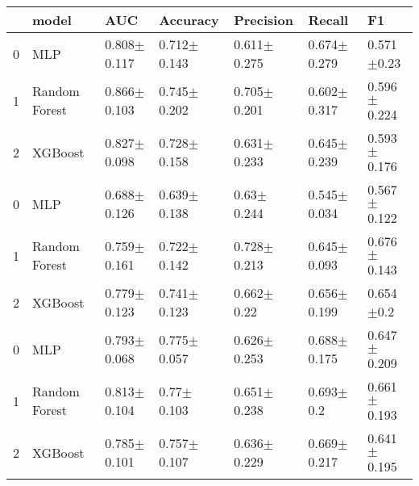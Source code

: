 \begin{tabular}{lllllll}
\toprule
 & model & AUC & Accuracy & Precision & Recall & F1 \\
\midrule
0 & MLP & 0.808$\pm$0.117 & 0.712$\pm$0.143 & 0.611$\pm$0.275 & 0.674$\pm$0.279 & 0.571$\pm$0.23 \\
1 & Random Forest & 0.866$\pm$0.103 & 0.745$\pm$0.202 & 0.705$\pm$0.201 & 0.602$\pm$0.317 & 0.596$\pm$0.224 \\
2 & XGBoost & 0.827$\pm$0.098 & 0.728$\pm$0.158 & 0.631$\pm$0.233 & 0.645$\pm$0.239 & 0.593$\pm$0.176 \\
0 & MLP & 0.688$\pm$0.126 & 0.639$\pm$0.138 & 0.63$\pm$0.244 & 0.545$\pm$0.034 & 0.567$\pm$0.122 \\
1 & Random Forest & 0.759$\pm$0.161 & 0.722$\pm$0.142 & 0.728$\pm$0.213 & 0.645$\pm$0.093 & 0.676$\pm$0.143 \\
2 & XGBoost & 0.779$\pm$0.123 & 0.741$\pm$0.123 & 0.662$\pm$0.22 & 0.656$\pm$0.199 & 0.654$\pm$0.2 \\
0 & MLP & 0.793$\pm$0.068 & 0.775$\pm$0.057 & 0.626$\pm$0.253 & 0.688$\pm$0.175 & 0.647$\pm$0.209 \\
1 & Random Forest & 0.813$\pm$0.104 & 0.77$\pm$0.103 & 0.651$\pm$0.238 & 0.693$\pm$0.2 & 0.661$\pm$0.193 \\
2 & XGBoost & 0.785$\pm$0.101 & 0.757$\pm$0.107 & 0.636$\pm$0.229 & 0.669$\pm$0.217 & 0.641$\pm$0.195 \\
\bottomrule
\end{tabular}
